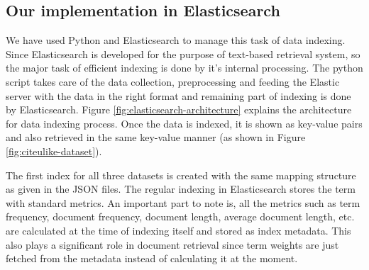 \subsection{Our implementation in Elasticsearch}
We have used Python and Elasticsearch to manage this task of data indexing. Since Elasticsearch is developed for the purpose of text-based retrieval system, so the major task of efficient indexing is done by it's internal processing. The python script takes care of the data collection, preprocessing and feeding the Elastic server with the data in the right format and remaining part of indexing is done by Elasticsearch. Figure \ref{fig:elasticsearch-architecture} explains the architecture for data indexing process. Once the data is indexed, it is shown as key-value pairs and also retrieved in the same key-value manner (as shown in Figure \ref{fig:citeulike-dataset}). 


The first index for all three datasets is created with the same mapping structure as given in the JSON files. The regular indexing in Elasticsearch stores the term with standard metrics. An important part to note is, all the metrics such as term frequency, document frequency, document length, average document length, etc. are calculated at the time of indexing itself and stored as index metadata. This also plays a significant role in document retrieval since term weights are just fetched from the metadata instead of calculating it at the moment. 

